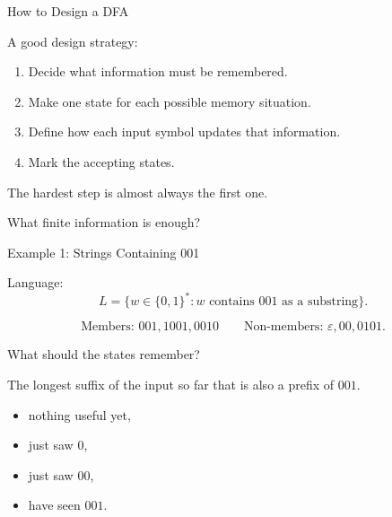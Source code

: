 \documentclass[10pt,aspectratio=169]{beamer}
\newcommand{\eps}{\varepsilon}
\begin{document}
\begin{frame}{How to Design a DFA}

A good design strategy:

\begin{enumerate}
\item Decide what information must be remembered.
\item Make one state for each possible memory situation.
\item Define how each input symbol updates that information.
\item Mark the accepting states.
\end{enumerate}


The hardest step is almost always the first one.

\begin{center}
What finite information is enough?
\end{center}

\end{frame}

\begin{frame}{Example 1: Strings Containing 001}

Language:
\[
L=\{w\in\{0,1\}^*: w\text{ contains }001\text{ as a substring}\}.
\]

\[
\text{Members: }001,1001,0010
\qquad
\text{Non-members: }\eps,00,0101.
\]


What should the states remember?


The longest suffix of the input so far that is also a prefix of $001$.

\begin{itemize}
\item nothing useful yet,
\item just saw $0$,
\item just saw $00$,
\item have seen $001$.
\end{itemize}

\end{frame}
\end{document}
